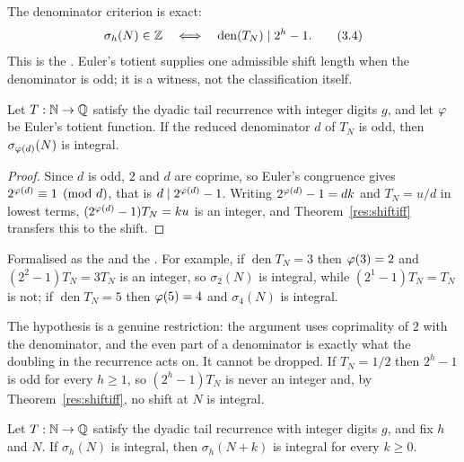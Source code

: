 \documentclass[11pt]{article}
\begin{document}
The denominator criterion is exact:
\[
  \sigma_h(N)\in\Z
  \quad\Longleftrightarrow\quad
  \operatorname{den}(T_N)\mid 2^h-1.
\tag{3.4}\label{eq:shift-denominator}
\]
This is the
.  Euler's totient supplies one admissible shift length when
the denominator is odd; it is a witness, not the classification itself.

\begin{theorem}\label{res:totient}
Let $T:\mathbb{N}\to\mathbb{Q}$ satisfy the dyadic tail recurrence with integer digits $g$, and
let $\varphi$ be Euler's totient function.  If the reduced denominator $d$ of
$T_N$ is odd, then $\sigma_{\varphi(d)}(N)$ is integral.
\end{theorem}

\begin{proof}
Since $d$ is odd, $2$ and $d$ are coprime, so Euler's congruence gives
$2^{\varphi(d)}\equiv1\pmod d$, that is $d\mid 2^{\varphi(d)}-1$.  Writing
$2^{\varphi(d)}-1=dk$ and $T_N=u/d$ in lowest terms, $(2^{\varphi(d)}-1)T_N=ku$ is an
integer, and Theorem~\ref{res:shiftiff} transfers this to the shift.
\end{proof}

\noindent Formalised as the
 and the
.  For example, if $\operatorname{den}T_N=3$ then $\varphi(3)=2$ and
$(2^{2}-1)T_N=3T_N$ is an integer, so $\sigma_2(N)$ is integral, while
$(2^{1}-1)T_N=T_N$ is not; if $\operatorname{den}T_N=5$ then $\varphi(5)=4$ and
$\sigma_4(N)$ is integral.

The hypothesis is a genuine restriction: the argument uses
coprimality of $2$ with the denominator, and the even part of a denominator is
exactly what the doubling in the recurrence acts on.  It cannot be dropped.
If $T_N=1/2$ then $2^{h}-1$ is odd for every $h\ge1$, so $(2^{h}-1)T_N$ is
never an integer and, by Theorem~\ref{res:shiftiff}, no shift at $N$ is
integral.

\begin{theorem}[propagation]\label{res:propagate}
Let $T:\mathbb{N}\to\mathbb{Q}$ satisfy the dyadic tail recurrence with integer digits $g$, and
fix $h$ and $N$.  If $\sigma_h(N)$ is integral, then $\sigma_h(N+k)$ is
integral for every $k\ge0$.
\end{theorem}
\end{document}
